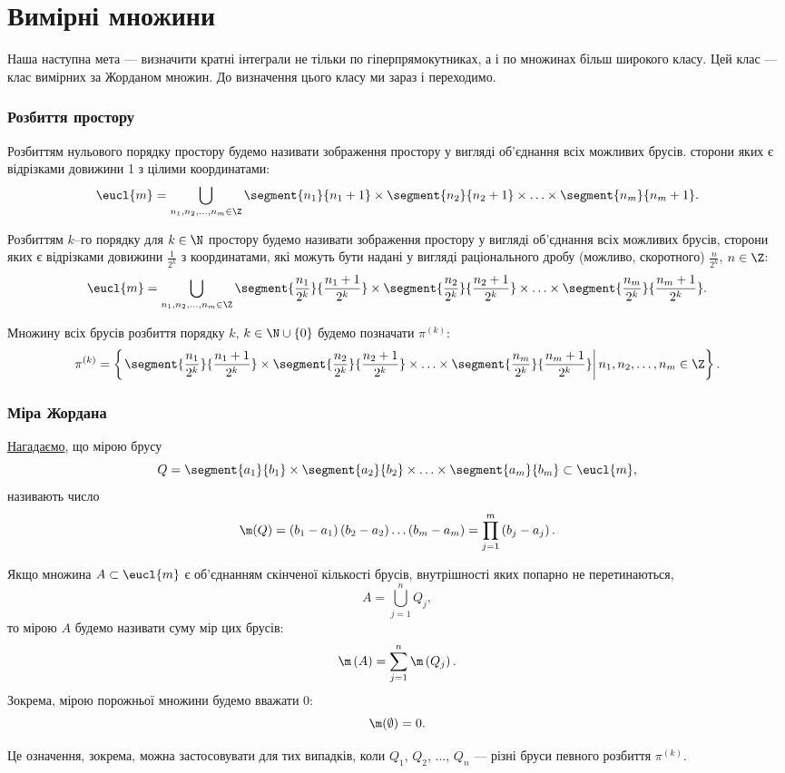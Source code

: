 \part{Вимірні множини}\label{part:measure}
Наша наступна мета --- визначити кратні інтеграли не тільки по гіперпрямокутниках, а і по множинах більш широкого класу. Цей клас --- клас вимірних за Жорданом множин. До визначення цього класу ми зараз і переходимо.
\section{Розбиття простору }
\begin{definition}
Розбиттям нульового порядку простору  будемо називати зображення простору  у вигляді об'єднання всіх можливих брусів. сторони яких є відрізками довижини 1 з цілими координатами:
\[
\eucl{m} = \bigcup\limits_{n_1, n_2, \ldots, n_m\in\Z}\segment{n_1}{n_1+1}\times\segment{n_2}{n_2+1}\times\ldots\times\segment{n_m}{n_m+1}.
\]
\end{definition}
\begin{definition}
Розбиттям $k$--го порядку для ${k\in\N}$ простору  будемо називати зображення простору  у вигляді об'єднання всіх можливих брусів, сторони яких є відрізками довижини ${\frac{1}{2^k}}$ з координатами, які можуть бути надані у вигляді раціонального дробу (можливо, скоротного) ${\frac{n}{2^k}}$, ${n\in\Z}$:
\[
\eucl{m} = \bigcup\limits_{n_1, n_2, \ldots, n_m\in\Z}\segment{\frac{n_1}{2^k}}{\frac{n_1+1}{2^k}}\times\segment{\frac{n_2}{2^k}}{\frac{n_2+1}{2^k}}\times\ldots\times\segment{\frac{n_m}{2^k}}{\frac{n_m+1}{2^k}}.
\]
\end{definition}
Множину всіх брусів розбиття порядку $k$, ${k\in\N\cup\{0\}}$ будемо позначати ${\pi^{(k)}}$:
\[
\pi^{(k)} =
\left\{
\left.
\segment{\frac{n_1}{2^k}}{\frac{n_1+1}{2^k}}\times\segment{\frac{n_2}{2^k}}{\frac{n_2+1}{2^k}}\times\ldots\times\segment{\frac{n_m}{2^k}}{\frac{n_m+1}{2^k}}
\right| n_1, n_2, \ldots, n_m\in\Z
\right\}.
\]
\section{Міра Жордана}
\hyperref[def:box]{Нагадаємо}, що мірою брусу
\[
Q = \segment{a_1}{b_1}\times\segment{a_2}{b_2}\times\ldots\times\segment{a_m}{b_m} \subset \eucl{m},
\]
називають число
\[
\m(Q) = \left(b_1-a_1\right)\left(b_2 - a_2\right)\ldots\left(b_m-a_m\right) = \prod\limits_{j=1}^{m}\left(b_j - a_j\right).
\]
\begin{definition}
Якщо множина ${A\subset\eucl{m}}$ є об'єднанням скінченої кількості брусів, внутрішності яких попарно не перетинаються,
\[
A = \bigcup\limits_{j=1}^nQ_j,
\]
то мірою $A$ будемо називати суму мір цих брусів:
\[
\m\left(A\right) = \sum\limits_{j=1}^n\m\left(Q_j\right).
\]
Зокрема, мірою порожньої множини будемо вважати 0:
\[
\m(\emptyset) = 0.
\]
\end{definition}
Це означення, зокрема, можна застосовувати для тих випадків, коли ${Q_1}$, ${Q_2}$, ${\ldots}$, ${Q_n}$ --- різні бруси певного розбиття ${\pi^{(k)}}$.

